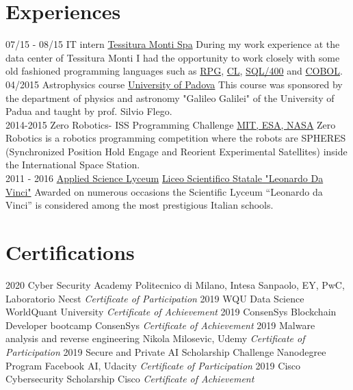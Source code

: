 \documentclass[]{friggeri-cv}
\begin{document}
\section{Experiences}
    \begin{entrylist} 
     \entry
    {07/15 - 08/15}
    {IT intern}
    {\href{http://www.monti.it/en_eu/}{Tessitura Monti Spa}}
    {During my work experience at the data center of Tessitura Monti I had the opportunity to work closely with some old fashioned programming languages such as \href{https://goo.gl/R4Tezc}{RPG}, \href{https://goo.gl/RsCpyU}{CL}, \href{https://goo.gl/T9cKu4}{SQL/400} and \href{https://goo.gl/Xs0BJz}{COBOL}.\\}
    \entry
    {04/2015}
    {Astrophysics course}
    {\href{http://www.dfa.unipd.it/}{University of Padova}}
    {This course was sponsored by the department of physics and astronomy "Galileo Galilei" of the University of Padua and taught by prof. Silvio Flego. \\} 
    \entry
    {2014-2015}
    {Zero Robotics- ISS Programming Challenge}
    { \href{http://zerorobotics.mit.edu/}{MIT, ESA, NASA}}
    {Zero Robotics is a robotics programming competition where the robots are SPHERES (Synchronized Position Hold Engage and Reorient Experimental Satellites) inside the International Space Station.\\}
    \entry
    {2011 - 2016}
    {\href{https://1drv.ms/b/s!Ap_mQ71ue930qnSZIBbkjV82or3Z}{Applied Science Lyceum}}
    { \href{http://www.liceodavinci.tv/sitoLiceo/index.php/}{Liceo Scientifico Statale "Leonardo Da Vinci"}}
    {Awarded on numerous occasions the Scientific Lyceum “Leonardo da Vinci” is considered among the most prestigious Italian schools.}
\end{entrylist}

\section{Certifications}
\begin{entrylist}
    \entry
    {2020}
    {Cyber Security Academy}
    {Politecnico di Milano, Intesa Sanpaolo, EY, PwC, Laboratorio Necst}
    {\emph{Certificate of Participation}}
    \entry
    {2019}
    {WQU Data Science}
    {WorldQuant University}
    {\emph{Certificate of Achievement}}
   \entry
    {2019}
    {ConsenSys Blockchain Developer bootcamp}
    {ConsenSys}
    {\emph{Certificate of Achievement}}
     \entry
    {2019}
    {Malware analysis and reverse engineering}
    {Nikola Milosevic, Udemy}
    {\emph{Certificate of Participation}}
    \entry
    {2019}
    {Secure and Private AI Scholarship Challenge Nanodegree Program}
    {Facebook AI, Udacity}
    {\emph{Certificate of Participation}}
    \entry
    {2019}
    {Cisco Cybersecurity Scholarship}
    {Cisco}
    {\emph{Certificate of Achievement}}

\end{entrylist}
\end{document}
